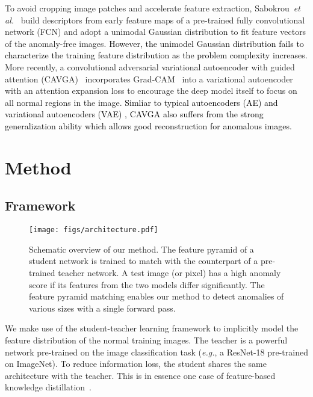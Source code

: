 \documentclass{bmvc2k}
\newcommand{\wgd}[1]{\textcolor{black}{{}#1}}
\begin{document}
To avoid cropping image patches and accelerate feature extraction, Sabokrou~\textit{et al.}~\cite{Sabokrou2018} build descriptors from early feature maps of a pre-trained fully convolutional network (FCN) and adopt a unimodal Gaussian distribution to fit feature vectors of the anomaly-free images. \wgd{However, the unimodel Gaussian distribution fails to characterize the training feature distribution as the problem complexity increases.}
More recently, a convolutional adversarial variational autoencoder with guided attention (CAVGA)~\cite{shashanka2020attention} incorporates Grad-CAM~\cite{Selvaraju2017} into a variational autoencoder with an attention expansion loss to encourage the deep model itself to focus on all normal regions in the image. \wgd{Simliar to typical autoencoders (AE) \cite{Bergmann2019, Bergmann2019b} and variational autoencoders (VAE) \cite{liu2020towards}, CAVGA also suffers from the strong generalization ability which allows good reconstruction for anomalous images.}






\section{Method}
\label{sec3}



\subsection{Framework}


\begin{figure*}[!t]
	\centering
	\texttt{[image: figs/architecture.pdf]}
	\caption{Schematic overview of our method. The feature pyramid of a student network is trained to match with the counterpart of a pre-trained teacher network. A test image (or pixel) has a high anomaly score if its features from the two models differ significantly. The feature pyramid matching enables our method to detect anomalies of various sizes with a single forward pass.}
	\label{fig2}
\end{figure*}

We make use of the student-teacher learning framework to implicitly model the feature distribution of the normal training images. The teacher is a powerful network pre-trained on the image classification task (\textit{e.g.}, a ResNet-18 pre-trained on ImageNet). To reduce information loss, the student shares the same architecture with the teacher. This is in essence one case of feature-based knowledge distillation~\cite{Wang2020}.
\end{document}
